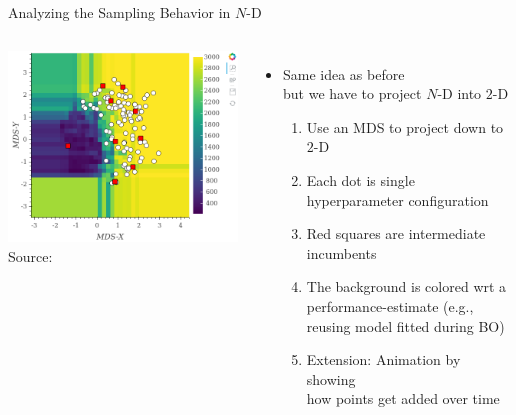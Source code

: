 \begin{frame}[c]{Analyzing the Sampling Behavior in $N$-D}


\begin{columns}
	
	\begin{center}
		\includegraphics[width=1.0\textwidth]{images/configurator_footprint0.png}\\
		Source: 
	\end{center}
	
	
	\begin{itemize}
		\item Same idea as before\\
		 but we have to project $N$-D into $2$-D
		\begin{enumerate}
			\item Use an MDS to project down to $2$-D
			\item Each dot is single hyperparameter configuration
			\item Red squares are intermediate incumbents
			\item The background is colored wrt a performance-estimate (e.g., reusing model fitted during BO) 
			\item Extension: Animation by showing\\ how points get added over time
		\end{enumerate}
	\end{itemize}
	
\end{columns}

\end{frame}
